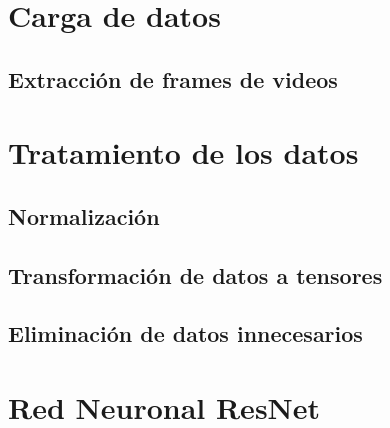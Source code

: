
\section{Carga de datos}

\subsection{Extracción de frames de videos}


\section{Tratamiento de los datos}

\subsection{Normalización}

\subsection{}

\subsection{Transformación de datos a tensores}

\subsection{}

\subsection{}

\subsection{Eliminación de datos innecesarios}


\section{Red Neuronal ResNet}

